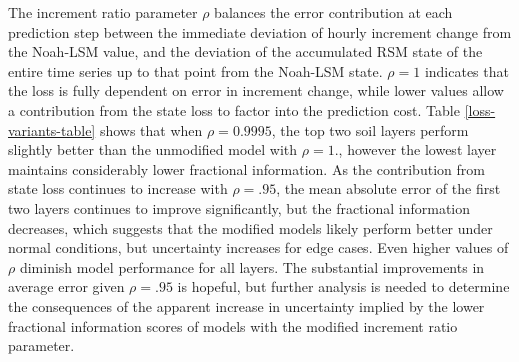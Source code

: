 The increment ratio parameter $\rho$ balances the error contribution at each prediction step between the immediate deviation of hourly increment change from the Noah-LSM value, and the deviation of the accumulated RSM state of the entire time series up to that point from the Noah-LSM state. $\rho=1$ indicates that the loss is fully dependent on error in increment change, while lower values allow a contribution from the state loss to factor into the prediction cost. Table \ref{loss-variants-table} shows that when $\rho=0.9995$, the top two soil layers perform slightly better than the unmodified model with $\rho=1.$, however the lowest layer maintains considerably lower fractional information. As the contribution from state loss continues to increase with $\rho=.95$, the mean absolute error of the first two layers continues to improve significantly, but the fractional information decreases, which suggests that the modified models likely perform better under normal conditions, but uncertainty increases for edge cases. Even higher values of $\rho$ diminish model performance for all layers. The substantial improvements in average error given $\rho=.95$ is hopeful, but further analysis is needed to determine the consequences of the apparent increase in uncertainty implied by the lower fractional information scores of models with the modified increment ratio parameter.

